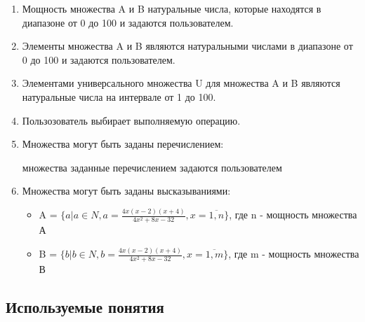 \documentclass[a4paper,12pt]{extarticle}
\begin{document}
\begin{enumerate}
  \item Мощность множества A и B натуральные числа, которые находятся в диапазоне от 0 до 100 и задаются пользователем.
  \item Элементы множества A и B являются натуральными числами в диапазоне от 0 до 100 и задаются пользователем.
  \item Элементами универсального множества U для множества A и B являются натуральные числа на интервале от 1 до 100.
  \item Пользозователь выбирает выполняемую операцию.
  \item Множества могут быть заданы перечислением:

  множества заданные перечислением задаются пользователем

  \item Множества могут быть заданы высказываниями:
  \begin{itemize}
    \item A = $\{a|a \in N, a = \frac{4x(x-2)(x+4)}{4x^2+8x-32}, x = \overline{1,n}\}$, где n - мощность множества А
    \item B = $\{b|b \in N, b = \frac{4x(x-2)(x+4)}{4x^2+8x-32}, x = \overline{1,m}\}$, где m - мощность множества В
  \end{itemize}
\end{enumerate}
\begin{center}
\section*{Используемые понятия}
\end{center}
\end{document}
